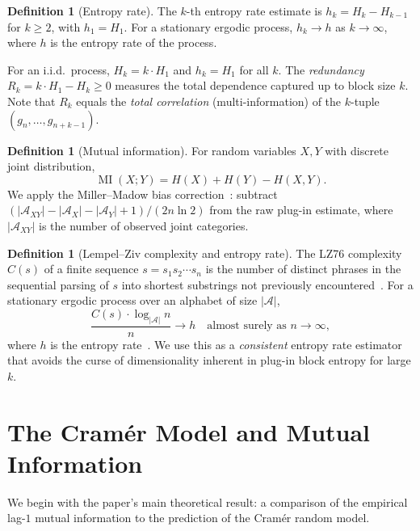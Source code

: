 \documentclass[11pt, a4paper]{amsart}
\theoremstyle{plain}
\theoremstyle{definition}
\newtheorem{definition}[theorem]{Definition}
\newcommand{\MI}{\operatorname{MI}}
\begin{document}
\begin{definition}[Entropy rate]
The $k$-th entropy rate estimate is $h_k = H_k - H_{k-1}$ for $k \ge 2$, with $h_1 = H_1$. For a stationary ergodic process, $h_k \to h$ as $k \to \infty$, where $h$ is the entropy rate of the process.
\end{definition}

For an i.i.d.\ process, $H_k = k \cdot H_1$ and $h_k = H_1$ for all $k$. The \emph{redundancy} $R_k = k \cdot H_1 - H_k \ge 0$ measures the total dependence captured up to block size $k$. Note that $R_k$ equals the \emph{total correlation} (multi-information) of the $k$-tuple $(g_n, \ldots, g_{n+k-1})$.

\begin{definition}[Mutual information]
For random variables $X, Y$ with discrete joint distribution,
\[
\MI(X; Y) = H(X) + H(Y) - H(X, Y).
\]
We apply the Miller--Madow bias correction~\cite{Miller1955}: subtract $(|\mathcal{A}_{XY}| - |\mathcal{A}_X| - |\mathcal{A}_Y| + 1) / (2 n \ln 2)$ from the raw plug-in estimate, where $|\mathcal{A}_{XY}|$ is the number of observed joint categories.
\end{definition}

\begin{definition}[Lempel--Ziv complexity and entropy rate]
The LZ76 complexity $C(s)$ of a finite sequence $s = s_1 s_2 \cdots s_n$ is the number of distinct phrases in the sequential parsing of $s$ into shortest substrings not previously encountered~\cite{LZ76}.
For a stationary ergodic process over an alphabet of size $|\mathcal{A}|$,
\[
\frac{C(s) \cdot \log_{|\mathcal{A}|} n}{n} \to h \quad \text{almost surely as } n \to \infty,
\]
where $h$ is the entropy rate~\cite{LZ76}. We use this as a \emph{consistent} entropy rate estimator that avoids the curse of dimensionality inherent in plug-in block entropy for large $k$.
\end{definition}


\section{The Cram\'er Model and Mutual Information}
\label{sec:cramer}

We begin with the paper's main theoretical result: a comparison of the empirical lag-$1$ mutual information to the prediction of the Cram\'er random model.
\end{document}
